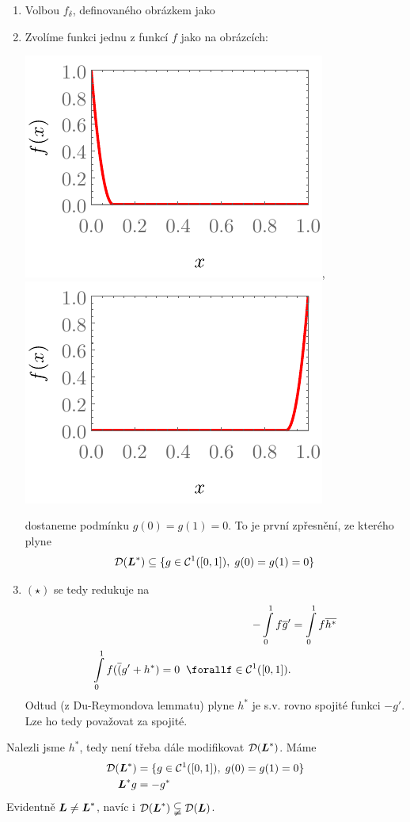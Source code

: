 {\begin{enumerate}
        Při dosazení těchto $f_\epsilon$ do $(\star)$ a provedením limity $\epsilon\rightarrow0^+$ dostaneme $[f \conj{g}]_0^1=0$.
    \item Volbou $f_\delta$, definovaného obrázkem jako
    \item Zvolíme funkci jednu z funkcí $f$ jako na obrázcích:
       
            {\centering \includegraphics{img/operator_derivovani_2.pdf}, \quad \includegraphics{img/operator_derivovani_3.pdf}}
            
        dostaneme podmínku $g(0)=g(1)=0$. To je první zpřesnění, ze kterého plyne $$\mathcal{D}(\boldsymbol{L}^*)\subseteq\{g\in\mathcal{C}^1([0,1]),\;g(0)=g(1)=0\}$$
    \item $(\star)$ se tedy redukuje na 
        \begin{align*}
            -\int\limits_0^1f\conj{g}'&=\int\limits_0^1f\conj{h^*}\\
            \int\limits_0^1f(\conj(g'+h^*)=0\;\;\forallf\in\mathcal{C}^1([0,1]).
        \end{align*}
        Odtud (z Du-Reymondova lemmatu) plyne $h^*$ je s.v. rovno spojité funkci $-g'$. Lze ho tedy považovat za spojité.
\end{enumerate}
Nalezli jsme $h^*$, tedy není třeba dále modifikovat $\mathcal{D}(\boldsymbol{L}^*)$. Máme
\begin{align*}
    \mathcal{D}(\boldsymbol{L}^*) &= \{ g\in\mathcal{C}^1([0,1]),\;g(0)=g(1)=0\}\\
    \boldsymbol{L}^*g&=-g^*
\end{align*}
Evidentně $\boldsymbol{L}\neq \boldsymbol{L}^*$, navíc i $\mathcal{D}(\boldsymbol{L}^*)\subsetneqq \mathcal{D}(\boldsymbol{L})$.

}
